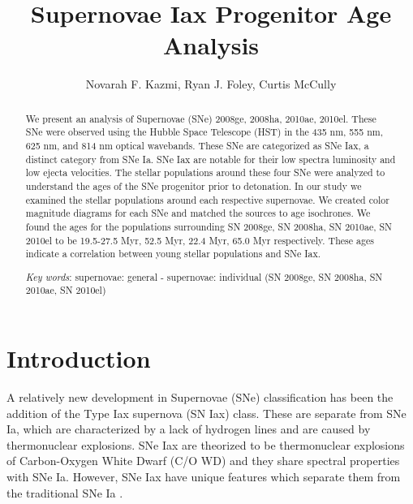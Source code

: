 \documentclass[preprint]{aastex}
\begin{document}
\title{Supernovae Iax Progenitor Age Analysis}

\author{Novarah F. Kazmi, Ryan J. Foley, Curtis McCully}

\begin{abstract}
\noindent We present an analysis of Supernovae (SNe) 2008ge, 2008ha, 2010ae, 
2010el. These SNe were observed using the Hubble Space Telescope (HST) in the
435 nm, 555 nm, 625 nm, and 814 nm optical wavebands. 
These SNe are categorized as SNe Iax, a distinct category from SNe Ia. 
SNe Iax are notable for their low spectra luminosity and low ejecta velocities. 
The stellar populations around these four SNe were analyzed to understand
 the ages of the SNe progenitor prior to detonation.
In our study we examined the stellar populations
around each respective supernovae. We created color magnitude diagrams 
for each SNe and matched the sources to age isochrones. 
We found the ages for the populations surrounding SN 2008ge, SN 2008ha, SN 2010ae, 
SN 2010el to be 19.5-27.5 Myr, 52.5 Myr, 22.4 Myr, 65.0 Myr respectively. 
These ages indicate a correlation between young stellar populations and
SNe Iax. 

\noindent\textit{Key words}: supernovae: general - supernovae: individual (SN 2008ge, SN 2008ha, 
SN 2010ae, SN 2010el)%
\end{abstract}

\section{Introduction}
A relatively new development in Supernovae (SNe) classification 
has been the addition of the Type Iax supernova (SN Iax) class.
These are separate from SNe Ia, which are characterized by a lack of 
hydrogen lines and are caused by thermonuclear explosions.
SNe Iax are theorized to be thermonuclear explosions of Carbon-Oxygen
White Dwarf (C/O WD) and they share spectral properties with SNe Ia.
However, SNe Iax have unique features which separate them from the traditional SNe Ia \citep{fol1304}. 
\end{document}
